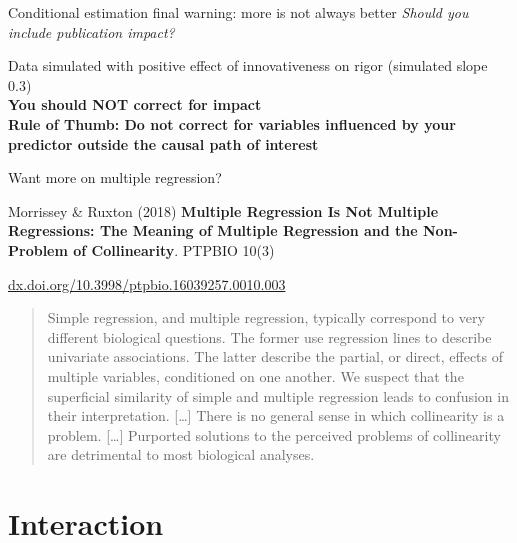 \documentclass[10pt]{beamer}\usepackage[]{graphicx}\usepackage[]{color}
\begin{document}
\begin{frame}[fragile]{Conditional estimation final warning: more is not always better}
    \textit{Should you include publication impact?}

  \pause
  Data simulated with positive effect of innovativeness on rigor (simulated slope 0.3)\\ \pause
  \textbf{You should NOT correct for impact}\\ \bigskip \pause
  \textbf{\large \color{red} Rule of Thumb: Do not correct for variables influenced by your predictor outside the causal path of interest}
\end{frame}

\begin{frame}{}

\end{frame}

\begin{frame}{Want more on multiple regression?}

Morrissey \& Ruxton (2018) \textbf{Multiple Regression Is Not Multiple Regressions: The Meaning of Multiple Regression and the Non-Problem of Collinearity}. PTPBIO 10(3)

{\color{blue} \href{dx.doi.org/10.3998/ptpbio.16039257.0010.003}{dx.doi.org/10.3998/ptpbio.16039257.0010.003}}
 
 \begin{quote}
 Simple regression, and multiple regression, typically correspond to very different biological questions. The former use regression lines to describe univariate associations. The latter describe the partial, or direct, effects of multiple variables, conditioned on one another. We suspect that the superficial similarity of simple and multiple regression leads to confusion in their interpretation. [\dots] There is no general sense in which collinearity is a problem. [\dots] Purported solutions to the perceived problems of collinearity are detrimental to most biological analyses.
 \end{quote}
\end{frame}

\section{Interaction}
\end{document}
